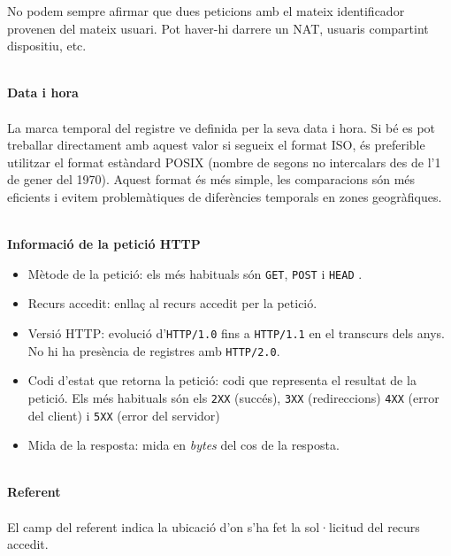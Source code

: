\begin{tcolorbox}[colback=green!5!white, colframe=green!50!black, title=Els usuaris poden estar darrera d'un NAT]\label{tcbox:iguals-emmascarats}
    No podem sempre afirmar que dues peticions amb el mateix identificador provenen del mateix usuari.
    Pot haver-hi darrere un \gls{NAT}, usuaris compartint dispositiu, etc.
\end{tcolorbox}

\clearpage

\noindent \\
\textbf{Data i hora} \\ \\
La marca temporal del registre ve definida per la seva data i hora.
Si bé es pot treballar directament amb aquest valor si segueix el format \gls{ISO}, és preferible utilitzar el format estàndard \gls{POSIX} (nombre de segons no intercalars des de l'1 de gener del 1970).
Aquest format és més simple, les comparacions són més eficients i evitem problemàtiques de diferències temporals en zones geogràfiques.

\noindent \\
\textbf{Informació de la petició \gls{HTTP}}~\cite{http} \\

\begin{itemize}
    \item Mètode de la petició: els més habituals són \texttt{GET}, \texttt{POST} i \texttt{HEAD} .
    \item Recurs accedit: enllaç al recurs accedit per la petició.
    \item Versió \gls{HTTP}: evolució d'\texttt{HTTP/1.0} fins a \texttt{HTTP/1.1} en el transcurs dels anys.
    No hi ha presència de registres amb \texttt{HTTP/2.0}.
    \item Codi d'estat que retorna la petició: codi que representa el resultat de la petició.
    Els més habituals són els \texttt{2XX} (succés), \texttt{3XX} (redireccions) \texttt{4XX} (error del client) i \texttt{5XX} (error del servidor)
    \item Mida de la resposta: mida en \textit{bytes} del cos de la resposta.
\end{itemize}

\noindent \\
\textbf{Referent} \\ \\
El camp del referent indica la ubicació d’on s’ha fet la sol·licitud del recurs accedit.

